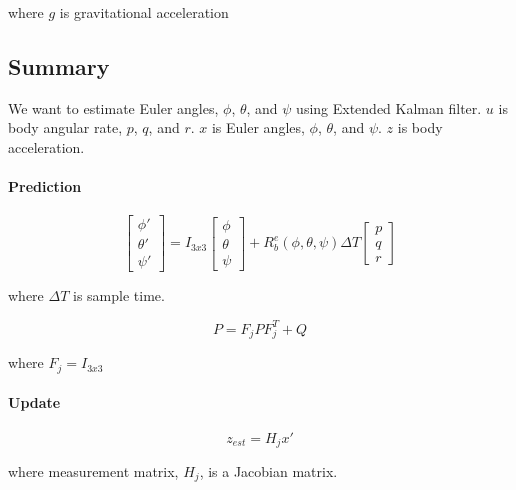 \documentclass[]{article}
\begin{document}
where $g$ is gravitational acceleration

\subsection{Summary}

We want to estimate Euler angles, $\phi$, $\theta$, and $\psi$ using Extended Kalman filter. $u$ is body angular rate, $p$, $q$, and $r$. $x$ is Euler angles, $\phi$, $\theta$, and $\psi$. $z$ is body acceleration.

\paragraph*{Prediction}

\begin{equation}
	\begin{bmatrix}
		\phi' \\
		\theta' \\
		\psi'
	\end{bmatrix} = I_{3x3} 
	\begin{bmatrix}
		\phi \\
		\theta \\
		\psi
	\end{bmatrix} + 
	R_b^e(\phi, \theta, \psi)
	\Delta T
	\begin{bmatrix}
		p \\
		q \\
		r
	\end{bmatrix}
\end{equation}

where $\Delta T$ is sample time.

\begin{equation}
	P = F_j P F_j^T + Q\label{eqn:predict_covarance}
\end{equation}

where $F_j = I_{3x3}$


\paragraph*{Update}


\begin{equation}
	z_{est} = H_j x'\label{eqn:predict_measurement}
\end{equation}

where measurement matrix, $H_j$, is a Jacobian matrix.
\end{document}
